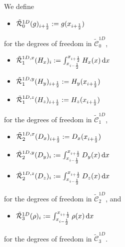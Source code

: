 \documentclass[11pt]{article}
\begin{document}
We define
\begin{itemize}
    \item $\tilde{\mathcal{R}}^{1D}_0(g)_{{i+\frac12}} := g(x_{i+\frac12})$
\end{itemize}
for the degrees of freedom in $\tilde{\mathcal{C}}_0^{1D}$,
\begin{itemize}
    \item $\tilde{\mathcal{R}}^{1D,x}_1(H_x)_{i} := \int_{x_{i-\frac12}}^{x_{{i+\frac12}}} H_x(x)\, {\rm d} x $
    \item $\tilde{\mathcal{R}}^{1D,y}_1(H_y)_{{i+\frac12}} := H_y(x_{i+\frac12})$
    \item $\tilde{\mathcal{R}}^{1D,z}_1(H_z)_{{i+\frac12}} := H_z(x_{i+\frac12}) $
\end{itemize}
for the degrees of freedom in $\tilde{\mathcal{C}}_1^{1D}$,
\begin{itemize}
    \item $\tilde{\mathcal{R}}^{1D,x}_2(D_x)_{{i+\frac12}} := D_x(x_{i+\frac12}) $
    \item $\tilde{\mathcal{R}}^{1D,y}_2(D_y)_{i} := \int_{x_{i-\frac12}}^{x_{{i+\frac12}}} D_y(x)\, {\rm d} x  $
    \item $\tilde{\mathcal{R}}^{1D,z}_2(D_z)_{i} := \int_{x_{i-\frac12}}^{x_{{i+\frac12}}} D_z(x)\, {\rm d} x  $
\end{itemize}
for the degrees of freedom in $\tilde{\mathcal{C}}_2^{1D}$,
and
\begin{itemize}
	\item $\tilde{\mathcal{R}}^{1D}_3(\rho)_{i} := \int_{x_{i-\frac12}}^{x_{{i+\frac12}}} \rho(x)\, {\rm d} x $
\end{itemize}
for the degrees of freedom in $\tilde{\mathcal{C}}_3^{1D}$.
\end{document}
